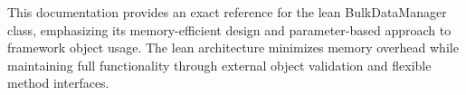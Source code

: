 This documentation provides an exact reference for the lean BulkDataManager class, emphasizing its memory-efficient design and parameter-based approach to framework object usage. The lean architecture minimizes memory overhead while maintaining full functionality through external object validation and flexible method interfaces.

